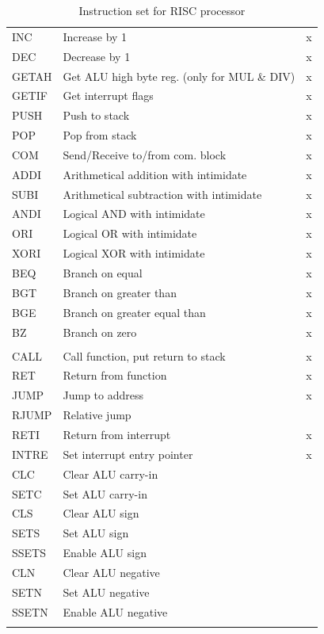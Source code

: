 \documentclass[a4paper,12pt]{article}
\begin{document}
\begin{longtable}{| l | p{} | c |}
	INC  & Increase by 1 & x \\
	DEC  & Decrease by 1  & x \\
	GETAH& Get ALU high byte reg. (only for MUL \& DIV) & x \\
	GETIF& Get interrupt flags & x \\\hline
		
	PUSH & Push to stack & x \\
	POP  & Pop from stack & x \\
	COM  & Send/Receive to/from com. block & x \\\hline
	
	ADDI & Arithmetical addition with intimidate & x \\
	SUBI & Arithmetical subtraction with intimidate & x \\
	ANDI & Logical AND with intimidate & x \\
	ORI  & Logical OR with intimidate & x \\
	XORI & Logical XOR with intimidate & x \\\hline
	
	BEQ  & Branch on equal & x \\
	BGT  & Branch on greater than & x \\
	BGE  & Branch on greater equal than & x \\
	BZ   & Branch on zero & x \\
		
	\arrayrulecolor{black}\hline
	\multicolumn{3}{|c|}{
		\cellcolor[rgb]{0.7,0.7,1}\textit{0 register instructions}
	} \\
	\hline\arrayrulecolor[rgb]{0.82,0.82,0.82} 
		
	CALL & Call function, put return to stack & x \\
	RET  & Return from function & x \\
	JUMP & Jump to address & x \\
	RJUMP& Relative jump & \\\hline
	RETI & Return from interrupt & x \\
	INTRE& Set interrupt entry pointer & x \\\hline
	
	CLC  & Clear ALU carry-in & \\
	SETC & Set ALU carry-in & \\
	CLS  & Clear ALU sign & \\
	SETS & Set ALU sign & \\
	SSETS& Enable ALU sign & \\
	CLN  & Clear ALU negative & \\
	SETN & Set ALU negative & \\
	SSETN& Enable ALU negative & \\

		
	\arrayrulecolor{black}\hline
	
	\caption{Instruction set for RISC processor}
	\label{table:risc_instr}
\end{longtable}	
\end{document}
